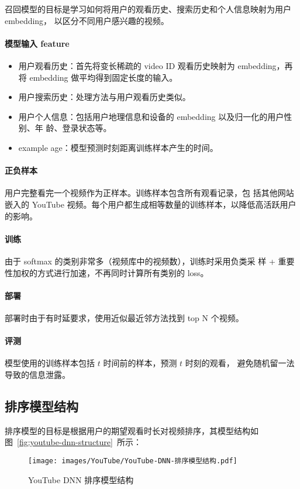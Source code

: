 召回模型的目标是学习如何将用户的观看历史、搜索历史和个人信息映射为用户 embedding，
以区分不同用户感兴趣的视频。

\paragraph{模型输入 feature}
\begin{itemize}
  \item 用户观看历史：首先将变长稀疏的 video ID 观看历史映射为 embedding，再将
    embedding 做平均得到固定长度的输入。
  \item 用户搜索历史：处理方法与用户观看历史类似。
  \item 用户个人信息：包括用户地理信息和设备的 embedding 以及归一化的用户性别、年
    龄、登录状态等。
  \item example age：模型预测时刻距离训练样本产生的时间。
\end{itemize}
\paragraph{正负样本} 用户完整看完一个视频作为正样本。训练样本包含所有观看记录，包
括其他网站嵌入的 YouTube 视频。每个用户都生成相等数量的训练样本，以降低高活跃用户
的影响。
\paragraph{训练} 由于 softmax 的类别非常多（视频库中的视频数），训练时采用负类采
样 + 重要性加权的方式进行加速，不再同时计算所有类别的 loss。
\paragraph{部署} 部署时由于有时延要求，使用近似最近邻方法找到 top N 个视频。
\paragraph{评测} 模型使用的训练样本包括 $t$ 时间前的样本，预测 $t$ 时刻的观看，
避免随机留一法导致的信息泄露。

\subsection{排序模型结构}
排序模型的目标是根据用户的期望观看时长对视频排序，其模型结构如图~\ref{fig:youtube-dnn-structure}~所示：

\begin{figure}[ht]
  \centering
  \texttt{[image: images/YouTube/YouTube-DNN-排序模型结构.pdf]}
  \caption{YouTube DNN 排序模型结构}
  \label{fig:youtube-dnn-ranking-structure}
\end{figure}

